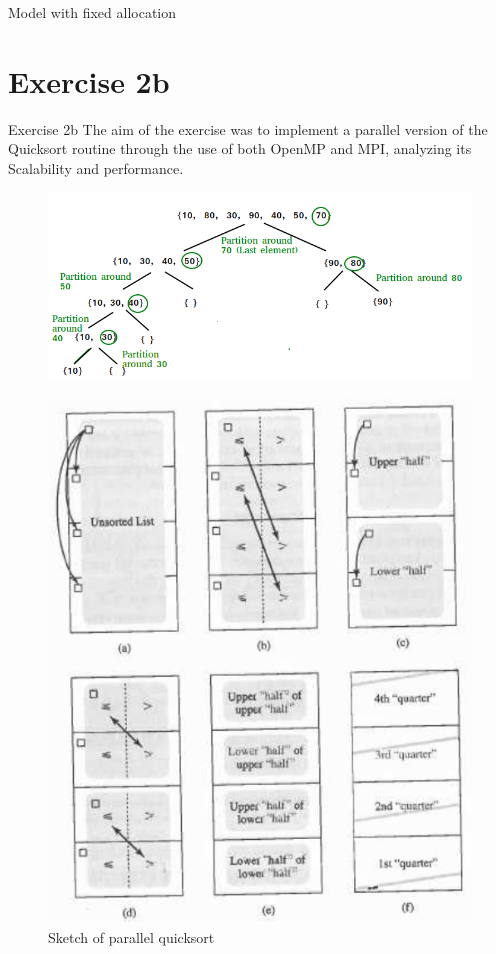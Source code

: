 \documentclass[11pt]{beamer}
\begin{document}
\begin{frame}
	\begin{center}
		
	\end{center}
	Model with fixed allocation %
\end{frame}

\section{Exercise 2b}
\begin{frame}{Exercise 2b}
	The aim of the exercise was to implement a parallel version of the Quicksort routine through the use of both OpenMP and MPI, analyzing its Scalability and performance.
\end{frame}

\begin{frame}
	\begin{figure}[h]
		\centering
		\includegraphics[width=0.7\linewidth]{../report/QuickSort2}
		\caption[Illustration of Quicksort algorithm]{}
		\label{fig:quicksort2}
	\end{figure}
\end{frame}

\begin{frame}
	\begin{figure}[h]
		\centering
		\includegraphics[height=0.7\linewidth]{../report/Parallel_quicksort}
		\caption{Sketch of parallel quicksort}
		\label{fig:parallelquicksort}
	\end{figure}
\end{frame}
\end{document}
